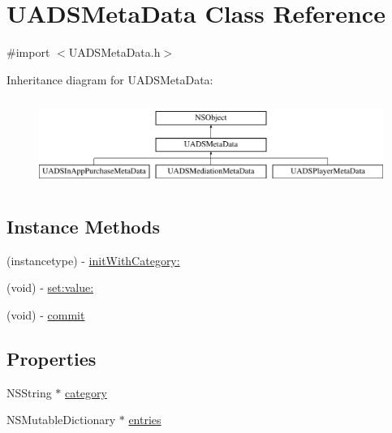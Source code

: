 \hypertarget{interface_u_a_d_s_meta_data}{}\section{U\+A\+D\+S\+Meta\+Data Class Reference}
\label{interface_u_a_d_s_meta_data}


{\ttfamily \#import $<$U\+A\+D\+S\+Meta\+Data.\+h$>$}

Inheritance diagram for U\+A\+D\+S\+Meta\+Data\+:\begin{figure}[H]
\begin{center}
\leavevmode
\includegraphics[height=2.871795cm]{interface_u_a_d_s_meta_data}
\end{center}
\end{figure}
\subsection*{Instance Methods}
\begin{DoxyCompactItemize}
\item 
(instancetype) -\/ \mbox{\hyperlink{interface_u_a_d_s_meta_data_a0875e3b109149d0b92112b69dd4620d1}{init\+With\+Category\+:}}
\item 
(void) -\/ \mbox{\hyperlink{interface_u_a_d_s_meta_data_ace97e85bbfad37c8d2b92ca7b3fc7b17}{set\+:value\+:}}
\item 
(void) -\/ \mbox{\hyperlink{interface_u_a_d_s_meta_data_a333b8cb442bac586a94270b0d944880a}{commit}}
\end{DoxyCompactItemize}
\subsection*{Properties}
\begin{DoxyCompactItemize}
\item 
N\+S\+String $\ast$ \mbox{\hyperlink{interface_u_a_d_s_meta_data_a53cb347f7356256b054a9e817234857c}{category}}
\item 
N\+S\+Mutable\+Dictionary $\ast$ \mbox{\hyperlink{interface_u_a_d_s_meta_data_a00f2e83e0ee9d76645a17cb82b8896a0}{entries}}
\end{DoxyCompactItemize}


